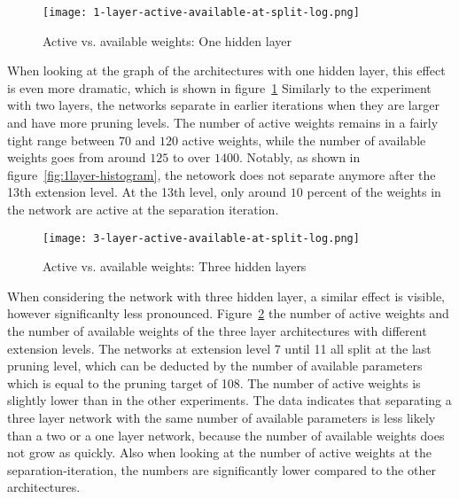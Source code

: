 \begin{figure}[ht] %
    \centering
    \texttt{[image: 1-layer-active-available-at-split-log.png]}
    \caption{Active vs. available weights: One hidden layer}\label{fig:1layer-active}
\end{figure}
When looking at the graph of the architectures with one hidden layer, this effect is even more dramatic, which is shown in figure~\ref{fig:1layer-active}
Similarly to the experiment with two layers, the networks separate in earlier iterations when they are larger and have more pruning levels.
The number of active weights remains in a fairly tight range between $70$ and $120$ active weights, while the number of available weights goes from around $125$ to over $1400$.
Notably, as shown in figure~\ref{fig:1layer-histogram}, the netowork does not separate anymore after the 13th extension level.
At the 13th level, only around $10$ percent of the weights in the network are active at the separation iteration.

\begin{figure}[ht] %
    \centering
    \texttt{[image: 3-layer-active-available-at-split-log.png]}
    \caption{Active vs. available weights: Three hidden layers}\label{fig:3layer-active}
\end{figure}
When considering the network with three hidden layer, a similar effect is visible, however significanlty less pronounced.
Figure~\ref{fig:3layer-active} the number of active weights and the number of available weights of the three layer architectures with different extension levels.
The networks at extension level 7 until 11 all split at the last pruning level, which can be deducted by the number of available parameters which is equal to the pruning target of 108.
The number of active weights is slightly lower than in the other experiments.
The data indicates that separating a three layer network with the same number of available parameters is less likely than a two or a one layer network, because the number of available weights does not grow as quickly.
Also when looking at the number of active weights at the separation-iteration, the numbers are significantly lower compared to the other architectures.

